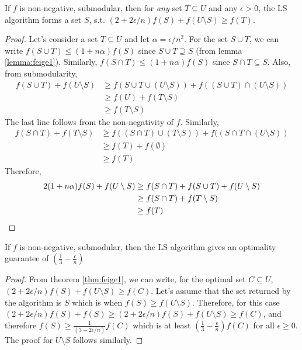 \begin{theorem}
\label{thm:feige1}
 If $f$ is non-negative, submodular, then for \emph{any} set $T\subseteq U$ and any $\epsilon>0$, the LS algorithm forms a set $S$, s.t. $(2+2\epsilon/n)f(S)+f(U\setminus S)\ge f(T)$.
\end{theorem}
\begin{proof}
 Let's consider a set $T\subseteq U$ and let $\alpha=\epsilon/n^2$. For the set $S\cup T$, we can write $f(S\cup T)\le(1+n\alpha)f(S)$ since $S\cup T\supseteq S$ (from lemma \ref{lemma:feige1}). Similarly, $f(S\cap T)\le(1+n\alpha)f(S)$ since $S\cap T\subseteq S$. Also, from submodularity,
 \begin{align}
 f(S\cup T)+f(U\setminus S)&\ge f(S\cup T\cup (U\setminus S))+f((S\cup T)\cap(U\setminus S))\\
       &\ge f(U)+f(T\setminus S)\\
       &\ge f(T\setminus S)
\end{align}
\noindent The last line follows from the non-negativity of $f$. Similarly, 
\begin{align}
 f(S\cap T)+f(T\setminus S)&\ge f((S\cap T)\cup (T\setminus S))+f((S\cap T\cap(U\setminus S))\\
       &\ge f(T)+f(\emptyset)\\
       &\ge f(T)
\end{align}
\noindent Therefore,
\begin{align}
 2(1+n\alpha)f(S)+f(U\setminus S)&\ge f(S\cap T)+f(S\cup T)+f(U\setminus S)\\
       &\ge f(S\cap T)+f(T\setminus S)\\
       &\ge f(T)\qedhere
\end{align}
\end{proof}

\begin{theorem}
\label{thm:feige2}
 If $f$ is non-negative, submodular, then the LS algorithm gives an optimality guarantee of $(\frac{1}{3}-\frac{\epsilon}{n})$
\end{theorem}
\begin{proof}
 From theorem \ref{thm:feige1}, we can write, for the optimal set $C\subseteq U$, $(2+2\epsilon/n)f(S)+f(U\setminus S)\ge f(C)$. Let's assume that the set returned by the algorithm is $S$ which is when $f(S)\ge f(U\setminus S)$. Therefore, for this case $(2+2\epsilon/n)f(S)+f(S)\ge (2+2\epsilon/n)f(S)+f(U\setminus S)\ge f(C)$, and therefore $f(S)\ge \frac{1}{(3+2\epsilon/n)}f(C)$ which is at least $(\frac{1}{3}-\frac{\epsilon}{n})f(C)$ for all $\epsilon\ge 0$. The proof for $U\setminus S$ follows similarly.
\end{proof}

